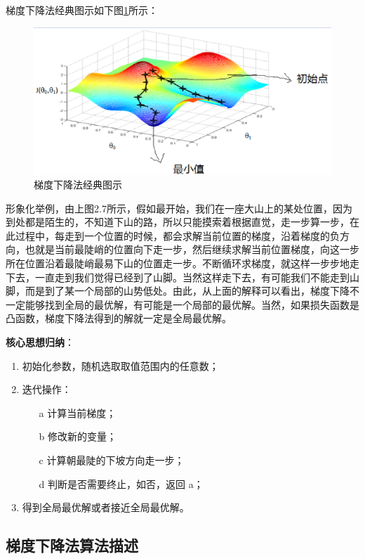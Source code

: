 梯度下降法经典图示如下图\ref{fig:2.7}所示：

 \begin{figure}[h]
   \centering
   \includegraphics[width=.7\textwidth]{imgs/2.25.1.eps}
   \caption{梯度下降法经典图示}
   \label{fig:2.7}
 \end{figure}

形象化举例，由上图2.7所示，假如最开始，我们在一座大山上的某处位置，因为到处都是陌生的，不知道下山的路，所以只能摸索着根据直觉，走一步算一步，在此过程中，每走到一个位置的时候，都会求解当前位置的梯度，沿着梯度的负方向，也就是当前最陡峭的位置向下走一步，然后继续求解当前位置梯度，向这一步所在位置沿着最陡峭最易下山的位置走一步。不断循环求梯度，就这样一步步地走下去，一直走到我们觉得已经到了山脚。当然这样走下去，有可能我们不能走到山脚，而是到了某一个局部的山势低处。由此，从上面的解释可以看出，梯度下降不一定能够找到全局的最优解，有可能是一个局部的最优解。当然，如果损失函数是凸函数，梯度下降法得到的解就一定是全局最优解。

{\bf 核心思想归纳}：

\begin{enumerate}
\itemsep0em
\item 初始化参数，随机选取取值范围内的任意数；
\item 迭代操作：
	\begin{enumerate}
	\itemsep0em
	\item[a] 计算当前梯度；
	\item[b] 修改新的变量；
	\item[c] 计算朝最陡的下坡方向走一步；
	\item[d] 判断是否需要终止，如否，返回 a；
	\end{enumerate}
\item 得到全局最优解或者接近全局最优解。
\end{enumerate}

\subsection{梯度下降法算法描述}

